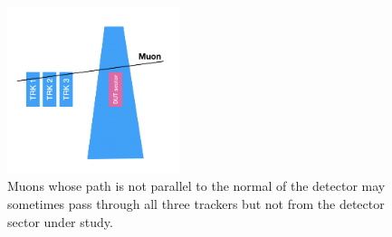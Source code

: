 \begin{figure}[htbp]
    \centering
    \includegraphics[width=0.45\textwidth]{Pictures/explain_why_fiducial_area.png}
    \caption{Muons whose path is not parallel to the normal of the detector may sometimes pass through all three trackers but not from the detector sector under study.}
    \label{fig:explain_why_fiducial_area}
\end{figure}

